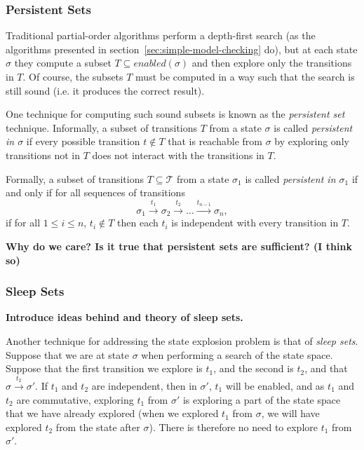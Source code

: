 \documentclass[12pt,a4paper,twoside,openright]{report}
\begin{document}
\subsubsection{Persistent Sets}
Traditional partial-order algorithms perform a depth-first
search (as the algorithms presented in
section~\ref{sec:simple-model-checking} do), but at each
state $\sigma$ they compute a subset
$T \subseteq \textit{enabled}(\sigma)$ and then explore
only the transitions in $T$. Of course, the subsets
$T$ must be computed in a way such that the search
is still sound (i.e. it produces the correct result).

One technique for computing such sound subsets is known
as the \emph{persistent set} technique. Informally,
a subset of transitions $T$ from a state $\sigma$
is called \emph{persistent in $\sigma$} if every
possible transition $t \not \in T$ that is reachable
from $\sigma$ by exploring only transitions not in
$T$ does not interact with the transitions
in $T$.

Formally, a subset of transitions $T \subseteq \mathcal{T}$
from a state $\sigma_1$
is called \emph{persistent in $\sigma_1$} if and only if
for all sequences of transitions
\[
	\sigma_1 \xrightarrow{\ t_1\ } \sigma_2 \xrightarrow{\ t_2\ } \ldots
	\xrightarrow{t_{n-1}} \sigma_n,
\]
if for all $1 \leq i \leq n$, $t_i \not \in T$ then each $t_i$ is
independent with every transition in $T$.

\textbf{Why do we care? Is it true that persistent sets are sufficient? (I think so)}

\subsubsection{Sleep Sets}
\textbf{Introduce ideas behind and theory of sleep sets.}

Another technique for addressing the state explosion
problem is that of \emph{sleep sets}. Suppose that
we are at state $\sigma$ when performing a search
of the state space. Suppose that the first transition
we explore is $t_1$, and the second is $t_2$, and
that $\sigma \xrightarrow{t_2} \sigma'$. If
$t_1$ and $t_2$ are independent, then in
$\sigma'$, $t_1$ will be enabled, and as
$t_1$ and $t_2$ are commutative, exploring
$t_1$ from $\sigma'$ is exploring a part
of the state space that we have already explored
(when we explored $t_1$ from $\sigma$, we will
have explored $t_2$ from the state after $\sigma$).
There is therefore no need to explore $t_1$ from
$\sigma'$.
\end{document}
